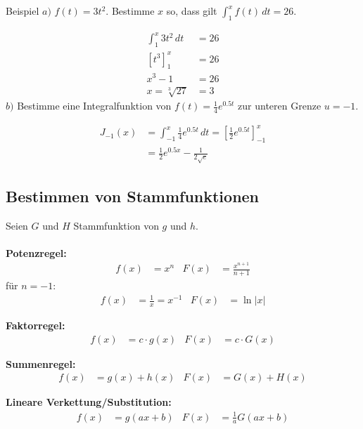 \documentclass{article}
\begin{document}
\begin{boxx}[DarkBlue]{Beispiel}
    $a)$\hspace{3mm} $\displaystyle f(t) = 3t^2$. 
    Bestimme $x$ so, dass gilt $\displaystyle \int_1^x f(t) \, dt = 26$.

    \begin{align*}
        \int_1^x 3t^2 \, dt &= 26 \\
        \left[t^3\right]_1^x &= 26 \\
        x^3 - 1 &= 26 \\
        x = \sqrt[3]{27} &= 3
    \end{align*}
    \newpage
    $b)$\hspace{3mm} Bestimme eine Integralfunktion von $\displaystyle f(t) = \frac{1}{4} e^{0.5t}$
    zur unteren Grenze $u=-1$.

    \begin{align*}
        J_{-1}(x) &= \int_{-1}^x \frac{1}{4}e^{0.5t} \, dt = \left[\frac{1}{2}e^{0.5t}\right]_{-1}^x \\
        &= \frac{1}{2} e^{0.5x} - \frac{1}{2\sqrt{e}}
    \end{align*}
\end{boxx}

\subsection{Bestimmen von Stammfunktionen}

Seien $G$ und $H$ Stammfunktion von $g$ und $h$.
\\\\
\textbf{Potenzregel:}
\begin{align*}
    &&&&&& f(x) &= x^n & F(x) &= \frac{x^{n+1}}{n+1} &&&&&&
\end{align*}
für $n=-1$:
\begin{align*}
    &&&&&& f(x) &= \frac{1}{x} = x^{-1}& F(x) &= \ln |x| &&&&&&
\end{align*}

\textbf{Faktorregel:}
\begin{align*}
    &&&&&& f(x) &= c \cdot g(x) & F(x) &= c \cdot G(x) &&&&&&
\end{align*}

\textbf{Summenregel:}
\begin{align*}
    &&&&&& f(x) &= g(x) + h(x) & F(x) &= G(x) + H(x) &&&&&&
\end{align*}

\textbf{Lineare Verkettung/Substitution:}
\begin{align*}
    &&&&&& f(x) &= g(ax + b) & F(x) &=\frac{1}{a}G(ax+b) &&&&&&
\end{align*}
\end{document}
